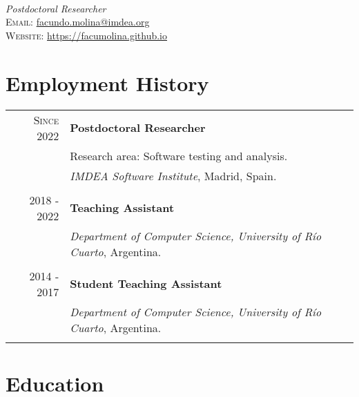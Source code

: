 \documentclass[a4paper,10pt]{article} %
\begin{document}
\pagestyle{empty} %


{} \\
\textit{Postdoctoral Researcher} \\
\textsc{Email:} \href{mailto:facundo.molina@imdea.org}{facundo.molina@imdea.org} \\
\textsc{Website:} \href{https://facumolina.github.io}{https://facumolina.github.io}


\section{Employment History}

\begin{tabular}{rl}
\\
\textsc{Since 2022}     & \textbf{Postdoctoral Researcher} \\
& Research area: Software testing and analysis. \\
& \textit{IMDEA Software Institute}, Madrid, Spain. \\ & \\

\textsc{2018 - 2022} & \textbf{Teaching Assistant} \\ & \textit{Department of Computer Science, University of Río Cuarto}, Argentina. \\ & \\

\textsc{2014 - 2017} & \textbf{Student Teaching Assistant} \\
& \textit{Department of Computer Science, University of Río Cuarto}, Argentina. \\ & \\
\end{tabular}


\section{Education}
\end{document}
